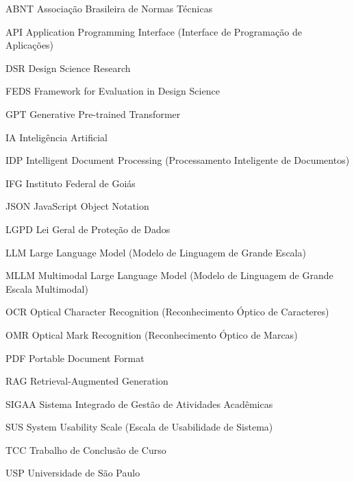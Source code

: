 \begin{siglas}
  \item[ABNT] Associação Brasileira de Normas Técnicas
  \item[API] Application Programming Interface (Interface de Programação de Aplicações)
  \item[DSR] Design Science Research
  \item[FEDS] Framework for Evaluation in Design Science
  \item[GPT] Generative Pre-trained Transformer
  \item[IA] Inteligência Artificial
  \item[IDP] Intelligent Document Processing (Processamento Inteligente de Documentos)
  \item[IFG] Instituto Federal de Goiás
  \item[JSON] JavaScript Object Notation
  \item[LGPD] Lei Geral de Proteção de Dados
  \item[LLM] Large Language Model (Modelo de Linguagem de Grande Escala)
  \item[MLLM] Multimodal Large Language Model (Modelo de Linguagem de Grande Escala Multimodal)
  \item[OCR] Optical Character Recognition (Reconhecimento Óptico de Caracteres)
  \item[OMR] Optical Mark Recognition (Reconhecimento Óptico de Marcas)
  \item[PDF] Portable Document Format
  \item[RAG] Retrieval-Augmented Generation
  \item[SIGAA] Sistema Integrado de Gestão de Atividades Acadêmicas
  \item[SUS] System Usability Scale (Escala de Usabilidade de Sistema)
  \item[TCC] Trabalho de Conclusão de Curso
  \item[USP] Universidade de São Paulo
\end{siglas}

\tableofcontents*
\cleardoublepage
